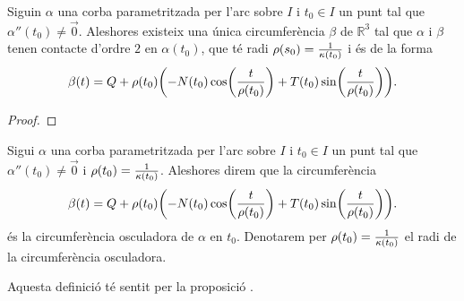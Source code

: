\documentclass[../Apunts.tex]{subfiles}
\begin{document}
	\begin{proposition}
		\label{prop:circumferència osculadora}
		Siguin \(\alpha\) una corba parametritzada per l'arc sobre \(I\) i \(t_{0}\in I\) un punt tal que \(\alpha''(t_{0})\neq\vec{0}\). Aleshores existeix una única circumferència \(\beta\) de \(\mathbb{R}^{3}\) tal que \(\alpha\) i \(\beta\) tenen contacte d'ordre \(2\) en \(\alpha(t_{0})\), que té radi \(\operatorname{\rho}(s_{0})=\frac{1}{\operatorname{\kappa}(t_{0})}\) i és de la forma
		\[\beta(t)=Q+\radicircosculadora(t_{0})\left(-N(t_{0})\cos\left(\frac{t}{\radicircosculadora(t_{0})}\right)+T(t_{0})\sin\left(\frac{t}{\radicircosculadora(t_{0})}\right)\right).\]
		\begin{proof}
%			
		\end{proof}
	\end{proposition}
	\begin{definition}
		\label{def:circumferència osculadora}
		Sigui \(\alpha\) una corba parametritzada per l'arc sobre \(I\) i \(t_{0}\in I\) un punt tal que \(\alpha''(t_{0})\neq\vec{0}\) i \(\operatorname{\rho}(t_{0})=\frac{1}{\operatorname{\kappa}(t_{0})}\). Aleshores direm que la circumferència
		\[\beta(t)=Q+\radicircosculadora(t_{0})\left(-N(t_{0})\cos\left(\frac{t}{\radicircosculadora(t_{0})}\right)+T(t_{0})\sin\left(\frac{t}{\radicircosculadora(t_{0})}\right)\right).\]
		és la circumferència osculadora de \(\alpha\) en \(t_{0}\). Denotarem per \(\operatorname{\rho}(t_{0})=\frac{1}{\operatorname{\kappa}(t_{0})}\) el radi de la circumferència osculadora.
		
		Aquesta definició té sentit per la proposició .
	\end{definition}
\end{document}

